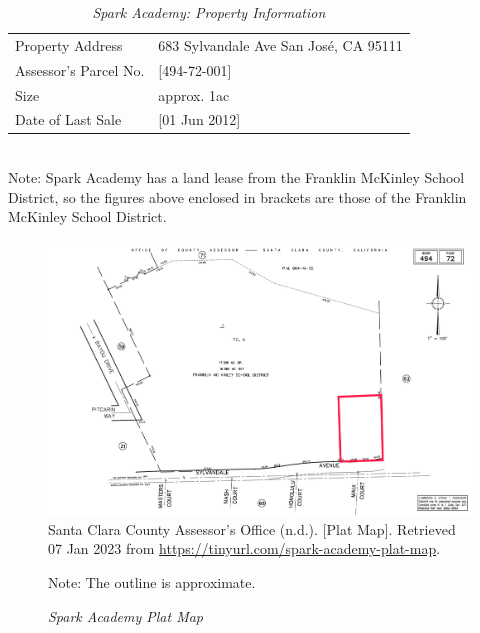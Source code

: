 \begin{table}[htb]
  \SingleSpacing%
  \caption[Spark Academy: Property Information]{\textit{Spark Academy: Property Information}}\label{tab:spark-academy-prop-info}
  \begin{tabular}{ll}
    \toprule
    Property Address      & 683 Sylvandale Ave San José, CA 95111 \\
    Assessor's Parcel No. & [494-72-001] \\
    Size                  & approx. 1ac \\
    Date of Last Sale     & [01 Jun 2012]\\
    \bottomrule
  \end{tabular}\\
  \noindent\footnotesize{Note: Spark Academy has a land lease from the Franklin McKinley School District, so the figures above enclosed in brackets are those of the Franklin McKinley School District.}  
\end{table}

\begin{figure}[hbt]
    \caption[Spark Academy Plat Map]{\textit{Spark Academy Plat Map}}\label{fig:spark-academy-plat-map}
    \includegraphics[width=\textwidth]{Assessor-Info/spark-academy-plat-map-494-72}\\ %
    \footnotesize{Santa Clara County Assessor's Office (n.d.). [Plat Map]. Retrieved 07 Jan 2023 from  \url{https://tinyurl.com/spark-academy-plat-map}}.
    
    \noindent\footnotesize{Note: The outline is approximate.}
  \end{figure}

